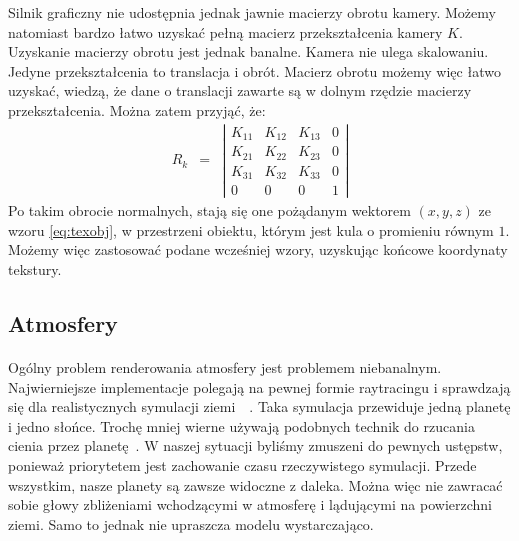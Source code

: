 Silnik graficzny nie udostępnia jednak jawnie macierzy obrotu kamery. Możemy natomiast bardzo łatwo uzyskać pełną macierz przekształcenia kamery $K$. Uzyskanie macierzy obrotu jest jednak banalne. Kamera nie ulega skalowaniu. Jedyne przekształcenia to translacja i obrót. Macierz obrotu możemy więc łatwo uzyskać, wiedzą, że dane o translacji zawarte są w dolnym rzędzie macierzy przekształcenia. Można zatem przyjąć, że:
\begin{eqnarray}
R_k &=&  
\left| \begin{array}{cccc}
K_{11} & K_{12} & K_{13} & 0 \\ 
K_{21} & K_{22} & K_{23} & 0 \\
K_{31} & K_{32} & K_{33} & 0 \\
0 & 0 & 0 & 1 
\end{array} \right|
\end{eqnarray}
Po takim obrocie normalnych, stają się one pożądanym wektorem $(x,y,z)$ ze wzoru \hyperref[eq:texobj]{\ref{eq:texobj}}, w przestrzeni obiektu, którym jest kula o promieniu równym $1$. Możemy więc zastosować podane wcześniej wzory, uzyskując końcowe koordynaty tekstury.

\subsection{Atmosfery}\label{sub:atmosfery}
\paragraph{}

Ogólny problem renderowania atmosfery jest problemem niebanalnym. Najwierniejsze implementacje polegają na pewnej formie raytracingu i sprawdzają się dla realistycznych symulacji ziemi~\cite{burneton:atmo}~\cite{gpugems:atmo}. Taka symulacja przewiduje jedną planetę i jedno słońce. Trochę mniej wierne używają podobnych technik do rzucania cienia przez planetę~\cite{josth:atmo}. W naszej sytuacji byliśmy zmuszeni do pewnych ustępstw, ponieważ priorytetem jest zachowanie czasu rzeczywistego symulacji. Przede wszystkim, nasze planety są zawsze widoczne z daleka. Można więc nie zawracać sobie głowy zbliżeniami wchodzącymi w atmosferę i lądującymi na powierzchni ziemi. Samo to jednak nie upraszcza modelu wystarczająco.

\paragraph{}

